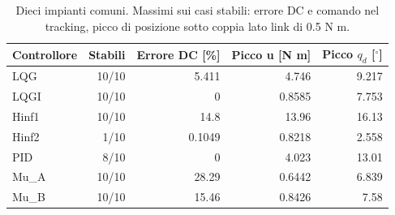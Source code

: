 \begin{table}[htbp]\centering\small
\setlength{\tabcolsep}{4pt}
\begin{tabular}{lrrrr}\toprule
Controllore & Stabili & Errore DC [\%] & Picco u [N m] & Picco $q_d$ [$^\circ$]\\\midrule
LQG & 10/10 & \num{5.411} & \num{4.746} & \num{9.217}\\
LQGI & 10/10 & 0 & \num{0.8585} & \num{7.753}\\
Hinf1 & 10/10 & \num{14.8} & \num{13.96} & \num{16.13}\\
Hinf2 & 1/10 & \num{0.1049} & \num{0.8218} & \num{2.558}\\
PID & 8/10 & 0 & \num{4.023} & \num{13.01}\\
Mu\_A & 10/10 & \num{28.29} & \num{0.6442} & \num{6.839}\\
Mu\_B & 10/10 & \num{15.46} & \num{0.8426} & \num{7.58}\\
\bottomrule\end{tabular}
\caption{Dieci impianti comuni. Massimi sui casi stabili: errore DC e comando nel tracking, picco di posizione sotto coppia lato link di 0.5 N m.}
\label{tab:impianti-comuni}
\end{table}
